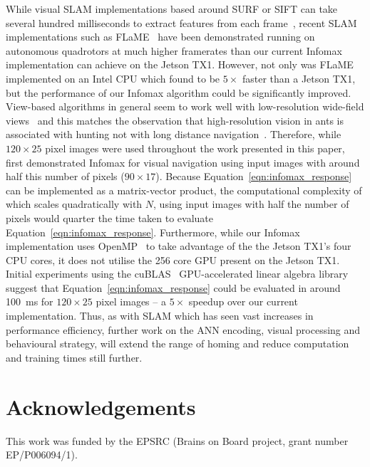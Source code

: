 \documentclass[letterpaper]{article}
\begin{document}
While visual SLAM implementations based around SURF or SIFT can take several hundred milliseconds to extract features from each frame~\citep{Bay2006}, recent SLAM implementations such as FLaME~\citep{Greene2017} have been demonstrated running on autonomous quadrotors at much higher framerates than our current Infomax implementation can achieve on the Jetson TX1.
However, not only was FLaME implemented on an Intel CPU which \citet{Biddulph2018} found to be $5\times$ faster than a Jetson TX1, but the performance of our Infomax algorithm could be significantly improved.
View-based algorithms in general seem to work well with low-resolution wide-field views~\citep{Wystrach2016} and this matches the observation that high-resolution vision in ants is associated with hunting not with long distance navigation~\citep{Wystrach2016}.
Therefore, while $120 \times 25$ pixel images were used throughout the work presented in this paper, \citet{Baddeley2012} first demonstrated Infomax for visual navigation using input images with around half this number of pixels ($90\times 17$).
Because Equation~\ref{eqn:infomax_response} can be implemented as a matrix-vector product, the computational complexity of which scales quadratically with $N$, using input images with half the number of pixels would quarter the time taken to evaluate Equation~\ref{eqn:infomax_response}. 
Furthermore, while our Infomax implementation uses OpenMP~\citep{Dagum1998} to take advantage of the the Jetson TX1's four CPU cores, it does not utilise the \num{256} core GPU present on the Jetson TX1. 
Initial experiments using the cuBLAS~\citep{NVIDIACorporation2007} GPU-accelerated linear algebra library suggest that Equation~\ref{eqn:infomax_response} could be evaluated in around \SI{100}{\milli\second} for $120 \times 25$ pixel images -- a $5 \times$ speedup over our current implementation.
Thus, as with SLAM which has seen vast increases in performance efficiency, further work on the ANN encoding, visual processing and behavioural strategy, will extend the range of homing and reduce computation and training times still further.

\section{Acknowledgements}
This work was funded by the EPSRC (Brains on Board project, grant number EP/P006094/1).

\scriptsize

\end{document}
